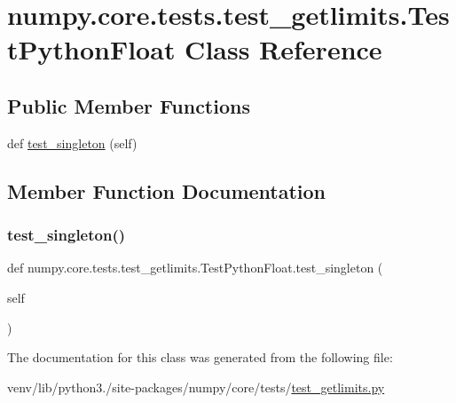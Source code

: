 \hypertarget{classnumpy_1_1core_1_1tests_1_1test__getlimits_1_1TestPythonFloat}{}\section{numpy.\+core.\+tests.\+test\+\_\+getlimits.\+Test\+Python\+Float Class Reference}
\label{classnumpy_1_1core_1_1tests_1_1test__getlimits_1_1TestPythonFloat}
\subsection*{Public Member Functions}
\begin{DoxyCompactItemize}
\item 
def \hyperlink{classnumpy_1_1core_1_1tests_1_1test__getlimits_1_1TestPythonFloat_a9170cb157ed34313b3fe72d61c2bd516}{test\+\_\+singleton} (self)
\end{DoxyCompactItemize}


\subsection{Member Function Documentation}
\mbox{\label{classnumpy_1_1core_1_1tests_1_1test__getlimits_1_1TestPythonFloat_a9170cb157ed34313b3fe72d61c2bd516}} 
\subsubsection{\texorpdfstring{test\+\_\+singleton()}{test\_singleton()}}
{\footnotesize\ttfamily def numpy.\+core.\+tests.\+test\+\_\+getlimits.\+Test\+Python\+Float.\+test\+\_\+singleton (\begin{DoxyParamCaption}\item[{}]{self }\end{DoxyParamCaption})}



The documentation for this class was generated from the following file\+:\begin{DoxyCompactItemize}
\item 
venv/lib/python3./site-\/packages/numpy/core/tests/\hyperlink{test__getlimits_8py}{test\+\_\+getlimits.\+py}\end{DoxyCompactItemize}
